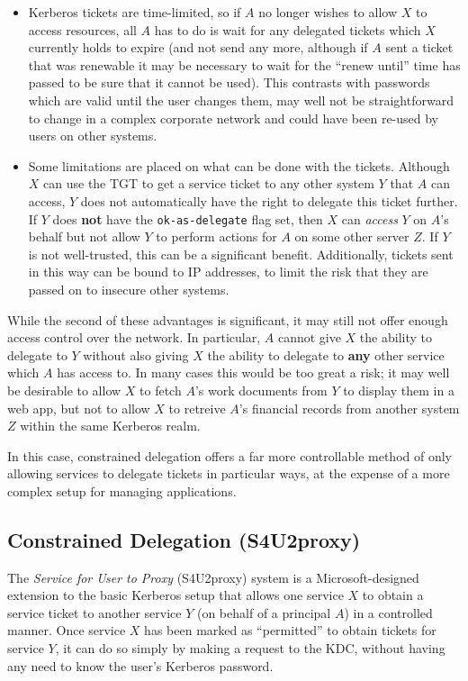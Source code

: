 \documentclass{report}
\begin{document}
\begin{itemize}
\item
  Kerberos tickets are time-limited, so if $A$ no longer wishes to allow $X$ to access resources, all $A$ has to do is wait for any delegated tickets which $X$ currently holds to expire (and not send any more, although if $A$ sent a ticket that was renewable it may be necessary to wait for the ``renew until'' time has passed to be sure that it cannot be used). This contrasts with passwords which are valid until the user changes them, may well not be straightforward to change in a complex corporate network and could have been re-used by users on other systems.
\item
  Some limitations are placed on what can be done with the tickets. Although $X$ can use the TGT to get a service ticket to any other system $Y$ that $A$ can access, $Y$ does not automatically have the right to delegate this ticket further. If $Y$ does \textbf{not} have the \verb+ok-as-delegate+ flag set, then $X$ can \textit{access} $Y$ on $A$'s behalf but not allow $Y$ to perform actions for $A$ on some other server $Z$. If $Y$ is not well-trusted, this can be a significant benefit. Additionally, tickets sent in this way can be bound to IP addresses, to limit the risk that they are passed on to insecure other systems.
\end{itemize}

While the second of these advantages is significant, it may still not offer enough access control over the network. In particular, $A$ cannot give $X$ the ability to delegate to $Y$ without also giving $X$ the ability to delegate to \textbf{any} other service which $A$ has access to. In many cases this would be too great a risk; it may well be desirable to allow $X$ to fetch $A$'s work documents from $Y$ to display them in a web app, but not to allow $X$ to retreive $A$'s financial records from another system $Z$ within the same Kerberos realm.

In this case, constrained delegation offers a far more controllable method of only allowing services to delegate tickets in particular ways, at the expense of a more complex setup for managing applications.

\subsection{Constrained Delegation (S4U2proxy)}
The \textit{Service for User to Proxy} (S4U2proxy) system is a Microsoft-designed extension to the basic Kerberos setup that allows one service $X$ to obtain a service ticket to another service $Y$ (on behalf of a principal $A$) in a controlled manner. Once service $X$ has been marked as ``permitted'' to obtain tickets for service $Y$, it can do so simply by making a request to the KDC, without having any need to know the user's Kerberos password\cite{MS-s4u2}.
\end{document}
